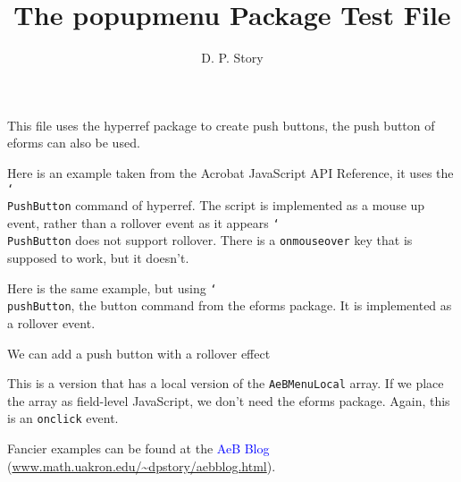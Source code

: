 \documentclass{article}
\title{The \texorpdfstring{\textsf{popupmenu}}{popupmenu} Package Test File}
\author{D. P. Story}
\newcommand{\cs}[1]{\texttt{\char`\\#1}}
\begin{document}
\maketitle

This file uses the \textsf{hyperref} package to create push buttons,
the push button of \textsf{eforms} can also be used.


Here is an example taken from the Acrobat JavaScript API Reference, it uses
the \cs{PushButton} command of \textsf{hyperref}. The script is implemented as
a mouse up event, rather than a rollover event as it appears \cs{PushButton} does not
support rollover. There is a \texttt{onmouseover} key that is supposed to work, but it doesn't.


Here is the same example, but using \cs{pushButton}, the button command from the eforms package.
It is implemented as a rollover event.

We can add a push button with a rollover effect

This is a version that has a local version of the \texttt{AeBMenuLocal}  array.
If we place the array as field-level JavaScript, we don't need the \textsf{eforms} package.
Again, this is an \texttt{onclick} event.

Fancier examples can be found at the \textcolor{blue}{AeB Blog} (\url{www.math.uakron.edu/~dpstory/aebblog.html}).
\end{document}
